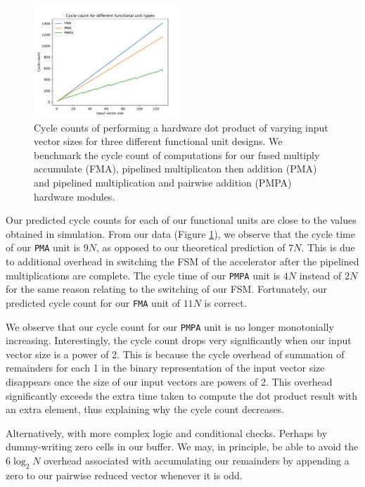\documentclass[a4paper,8pt]{report}
\begin{document}
\begin{figure}[h]
  \centering
  \includegraphics[width=0.5\textwidth]{./py/c2_fut.pdf}
  \caption{Cycle counts of performing a hardware dot product of varying input
    vector sizes for three different functional unit designs. We benchmark the
    cycle count of computations for our fused multiply accumulate (FMA),
    pipelined multiplicaton then addition (PMA) and pipelined multiplication and
    pairwise addition (PMPA) hardware modules.}
  \label{fig:c2_fut}
\end{figure}

Our predicted cycle counts for each of our functional units are close to the
values obtained in simulation.
From our data (Figure \ref{fig:c2_fut}), we observe that the cycle time of our \texttt{PMA} unit is $9N$,
as opposed to our theoretical prediction of $7N$. This is due to additional overhead in
switching the FSM of the accelerator after the pipelined multiplications are
complete. The cycle time of our \texttt{PMPA} unit is $4N$ instead of $2N$ for
the same reason relating to the switching of our FSM. Fortunately, our predicted
cycle count for our \texttt{FMA} unit of $11N$ is correct.

We observe that our cycle count for our \texttt{PMPA} unit is no longer
monotonially increasing. Interestingly, the cycle count drops very significantly when our input vector
size is a power of 2. This is because the cycle overhead of summation of
remainders for each 1 in the binary representation of the input vector size
disappears once the size of our input vectors are powers of 2. This overhead
significantly exceeds the extra time taken to compute the dot product result
with an extra element, thus explaining why the cycle count decreases.

Alternatively, with more complex logic and conditional checks. Perhaps by
dummy-writing zero cells in our buffer. We may, in principle, be able to avoid
the $6\log_2{N}$ overhead associated with accumulating our remainders by appending
a zero to our pairwise reduced vector whenever it is odd.
\end{document}
